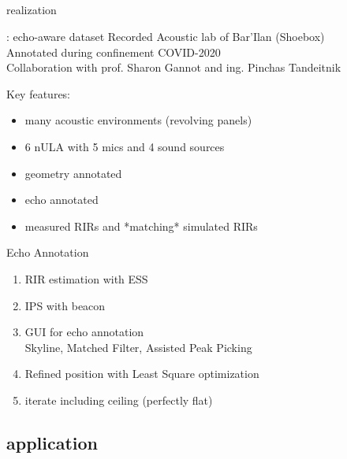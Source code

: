 \subsection{\dechorate}

\begin{frame}[t]{\dechorate realization}

    \begin{block}{\dechorate: echo-aware dataset}
        Recorded Acoustic lab of Bar'Ilan (Shoebox)
        \\Annotated during confinement COVID-2020
        \\Collaboration with prof. Sharon Gannot and ing. Pinchas Tandeitnik
    \end{block}

    \begin{block}{Key features:}
        \begin{itemize}
            \item many acoustic environments (revolving panels)
            \item 6 nULA with 5 mics and 4 sound sources
            \item geometry annotated
            \item echo annotated
            \item measured RIRs and *matching* simulated RIRs
        \end{itemize}
    \end{block}


    \begin{block}{Echo Annotation}
        \begin{enumerate}
            \item RIR estimation with ESS~\cite{farina2007advancements}
            \item IPS with beacon
            \item GUI for echo annotation
            \\Skyline, Matched Filter, Assisted Peak Picking
            \item Refined position with Least Square optimization
            \item iterate including ceiling (perfectly flat)
        \end{enumerate}
    \end{block}

    \vfill
\end{frame}

\subsection{application}

